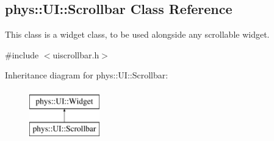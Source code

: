 \hypertarget{classphys_1_1UI_1_1Scrollbar}{
\subsection{phys::UI::Scrollbar Class Reference}
\label{d0/d3e/classphys_1_1UI_1_1Scrollbar}
}


This class is a widget class, to be used alongside any scrollable widget.  




{\ttfamily \#include $<$uiscrollbar.h$>$}

Inheritance diagram for phys::UI::Scrollbar:\begin{figure}[H]
\begin{center}
\leavevmode
\includegraphics[height=2.000000cm]{d0/d3e/classphys_1_1UI_1_1Scrollbar}
\end{center}
\end{figure}
